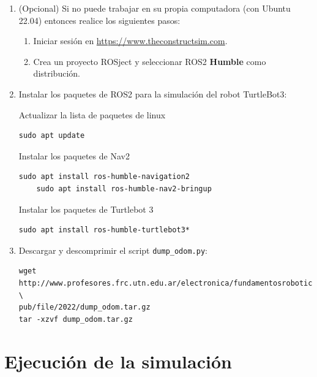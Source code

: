 \documentclass[tp]{lcc}
\begin{document}
\begin{enumerate}

\item (Opcional) Si no puede trabajar en su propia computadora (con Ubuntu 22.04) entonces realice los siguientes pasos:

\begin{enumerate}
	\item Iniciar sesión en \url{https://www.theconstructsim.com}.
	\item Crea un proyecto ROSject y seleccionar ROS2 {\bf Humble} como distribución.
\end{enumerate}


\item Instalar los paquetes de ROS2 para la simulación del robot TurtleBot3:

Actualizar la lista de paquetes de linux
\begin{lstlisting}[style=bash] 
    sudo apt update
\end{lstlisting}

Instalar los paquetes de Nav2 
\begin{lstlisting}[style=bash] 
	sudo apt install ros-humble-navigation2
	sudo apt install ros-humble-nav2-bringup
\end{lstlisting}

Instalar los paquetes de Turtlebot 3
\begin{lstlisting}[style=bash] 
	sudo apt install ros-humble-turtlebot3*
\end{lstlisting}

	\item Descargar y descomprimir el script \lstinline[style=bash]{dump_odom.py}:
	
\begin{lstlisting}[style=bash] 
wget http://www.profesores.frc.utn.edu.ar/electronica/fundamentosroboticamovil/ \
pub/file/2022/dump_odom.tar.gz
tar -xzvf dump_odom.tar.gz
\end{lstlisting}
	
\end{enumerate}

\section{Ejecución de la simulación}
\end{document}
